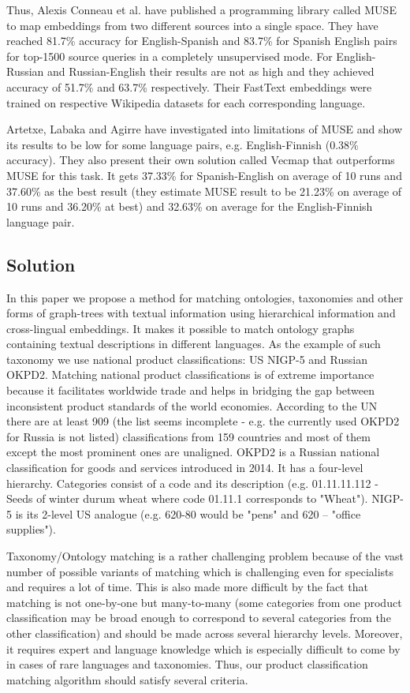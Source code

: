 \documentclass[11pt,a4paper]{article}
\begin{document}
Thus, Alexis Conneau et al. \cite{muse} have published a programming library called MUSE to map embeddings from two different sources into a single space. They have reached 81.7\% accuracy for English-Spanish and 83.7\% for Spanish English pairs for top-1500 source queries in a completely unsupervised mode. For English-Russian and Russian-English their results are not as high and they achieved accuracy of 51.7\% and 63.7\% respectively. Their FastText embeddings were trained on respective Wikipedia datasets for each corresponding language. 

Artetxe, Labaka and Agirre have investigated into limitations of MUSE and show its results to be low for some language pairs, e.g. English-Finnish (0.38\% accuracy). They also present their own solution called Vecmap \cite{vecmap} that outperforms MUSE for this task. It gets 37.33\% for Spanish-English on average of 10 runs and 37.60\% as the best result (they estimate MUSE result to be 21.23\% on average of 10 runs and 36.20\% at best) and 32.63\% on average for the English-Finnish language pair.

\subsection{Solution}
In this paper we propose a method for matching ontologies, taxonomies and other forms of graph-trees with textual information using hierarchical information and cross-lingual embeddings. It makes it possible to match ontology graphs containing textual descriptions in different languages. As the example of such taxonomy we use national product classifications: US NIGP-5 and Russian OKPD2. Matching national product classifications is of extreme importance because it facilitates worldwide trade and helps in bridging the gap between inconsistent product standards of the world economies. According to the UN \cite{unsd} there are at least 909 (the list seems incomplete - e.g. the currently used OKPD2 for Russia is not listed) classifications from 159 countries and most of them except the most prominent ones are unaligned. OKPD2 is a Russian national classification for goods and services introduced in 2014. It has a four-level hierarchy. Categories consist of a code and its description (e.g. 01.11.11.112 - Seeds of winter durum wheat where code 01.11.1 corresponds to "Wheat"). NIGP-5 is its 2-level US analogue (e.g. 620-80 would be "pens" and 620 -- "office supplies").

Taxonomy/Ontology matching is a rather challenging problem because of the vast number of possible variants of matching which is challenging even for specialists and requires a lot of time. This is also made more difficult by the fact that matching is not one-by-one but many-to-many (some categories from one product classification may be broad enough to correspond to several categories from the other classification) and should be made across several hierarchy levels. Moreover, it requires expert and language knowledge which is especially difficult to come by in cases of rare languages and taxonomies. Thus, our product classification matching algorithm should satisfy several criteria.
\end{document}

